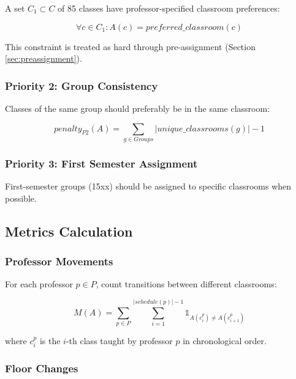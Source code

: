 \documentclass[algorithms,article,submit,pdftex,moreauthors]{Definitions/mdpi}
\begin{document}
A set $C_1 \subset C$ of 85 classes have professor-specified classroom preferences:

\begin{equation}
\forall c \in C_1: A(c) = preferred\_classroom(c)
\end{equation}

This constraint is treated as hard through pre-assignment (Section \ref{sec:preassignment}).

\subsubsection{Priority 2: Group Consistency}

Classes of the same group should preferably be in the same classroom:

\begin{equation}
penalty_{P2}(A) = \sum_{g \in Groups} |unique\_classrooms(g)| - 1
\end{equation}

\subsubsection{Priority 3: First Semester Assignment}

First-semester groups (15xx) should be assigned to specific classrooms when possible.

\subsection{Metrics Calculation}

\subsubsection{Professor Movements}

For each professor $p \in P$, count transitions between different classrooms:

\begin{equation}
M(A) = \sum_{p \in P} \sum_{i=1}^{|schedule(p)|-1} \mathbb{1}_{A(c_i^p) \neq A(c_{i+1}^p)}
\end{equation}

where $c_i^p$ is the $i$-th class taught by professor $p$ in chronological order.

\subsubsection{Floor Changes}
\end{document}
